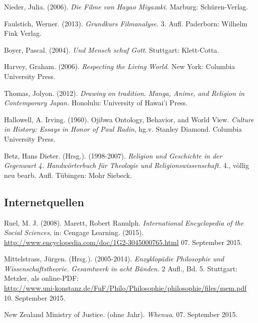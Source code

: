 \documentclass[a4paper]{article}
\begin{document}
\newpage
\begin{thebibliography}{9}

	Nieder, Julia. 
	(2006). 
	\emph{Die Filme von Hayao Miyazaki.}
	Marburg: Schüren-Verlag.

	Faulstich, Werner.
	(2013).
	\emph{Grundkurs Filmanalyse.} 
	3. Aufl. 
	Paderborn: Wilhelm Fink Verlag.

	Boyer, Pascal.
	(2004).
	\emph{Und Mensch schuf Gott.}
	Stuttgart: Klett-Cotta.

	Harvey, Graham.
	(2006).
	\emph{Respecting the Living World.}
	New York: Columbia University Press.

	Thomas, Jolyon.
	(2012).
	\emph{Drawing on tradition. Manga, Anime, and Religion in Contemporary Japan.}
	Honolulu: University of Hawai'i Press.

	Hallowell, A. Irving. (1960). \glqq Ojibwa Ontology, Behavior, and World View\glqq. \emph{Culture in History: Essays in Honor of Paul Radin}, hg.v. Stanley Diamond. Columbia University Press. 

	Betz, Hans Dieter. (Hrsg.). (1998-2007).
	\emph{Religion und Geschichte in der Gegenwart 4. Handwörterbuch für Theologie und Religionswissenschaft.} 4., völlig neu bearb. Aufl. Tübingen: Mohr Siebeck.

\subsection*{Internetquellen}

	Ruel, M. J. 
	(2008). 
	\glqq Marett, Robert Ranulph\grqq. \emph{International Encyclopedia of the Social Sciences}, in: Cengage Learning. (2015).\\ \url{http://www.encyclopedia.com/doc/1G2-3045000765.html} 07. September 2015.

	Mittelstrass, Jürgen. (Hrsg.). (2005-2014).
	\emph{Enzyklopädie Philosophie und Wissenschaftstheorie. Gesamtwerk in acht Bänden.} 2 Aufl., Bd. 5. Stuttgart: Metzler, als online-PDF:\\ \url{http://www.uni-konstanz.de/FuF/Philo/Philosophie/philosophie/files/mem.pdf} 10. September 2015.  

	New Zealand Ministry of Justice.
	(ohne Jahr).
	\emph{Whenua}.
	07. September 2015.
	

\end{thebibliography}
\end{document}
